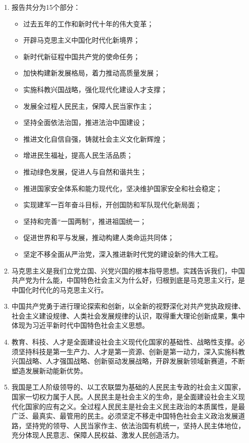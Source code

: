 \documentclass[UTF8,11pt,a4paper]{ctexart}
\begin{document}
\begin{enumerate}[label=\arabic*., leftmargin=2.3em]
\item 报告共分为15个部分：
\begin{itemize}[leftmargin=2.2em]
\item 过去五年的工作和新时代十年的伟大变革；
\item 开辟马克思主义中国化时代化新境界；
\item 新时代新征程中国共产党的使命任务；
\item 加快构建新发展格局，着力推动高质量发展；
\item 实施科教兴国战略，强化现代化建设人才支撑；
\item 发展全过程人民民主，保障人民当家作主；
\item 坚持全面依法治国，推进法治中国建设；
\item 推进文化自信自强，铸就社会主义文化新辉煌；
\item 增进民生福祉，提高人民生活品质；
\item 推动绿色发展，促进人与自然和谐共生；
\item 推进国家安全体系和能力现代化，坚决维护国家安全和社会稳定；
\item 实现建军一百年奋斗目标，开创国防和军队现代化新局面；
\item 坚持和完善“一国两制”，推进祖国统一；
\item 促进世界和平与发展，推动构建人类命运共同体；
\item 坚定不移全面从严治党，深入推进新时代党的建设新的伟大工程。
\end{itemize}
\item 马克思主义是我们立党立国、兴党兴国的根本指导思想。实践告诉我们，中国共产党为什么能，中国特色社会主义为什么好，归根到底是马克思主义行，是中国化时代化的马克思主义行。
\item 中国共产党勇于进行理论探索和创新，以全新的视野深化对共产党执政规律、社会主义建设规律、人类社会发展规律的认识，取得重大理论创新成果，集中体现为习近平新时代中国特色社会主义思想。
\item 教育、科技、人才是全面建设社会主义现代化国家的基础性、战略性支撑。必须坚持科技是第一生产力、人才是第一资源、创新是第一动力，深入实施科教兴国战略、人才强国战略、创新驱动发展战略，开辟发展新领域新赛道，不断塑造发展新动能新优势。
\item 我国是工人阶级领导的、以工农联盟为基础的人民民主专政的社会主义国家，国家一切权力属于人民。人民民主是社会主义的生命，是全面建设社会主义现代化国家的应有之义。全过程人民民主是社会主义民主政治的本质属性，是最广泛、最真实、最管用的民主。必须坚定不移走中国特色社会主义政治发展道路，坚持党的领导、人民当家作主、依法治国有机统一，坚持人民主体地位，充分体现人民意志、保障人民权益、激发人民创造活力。

\end{enumerate}
\end{document}
